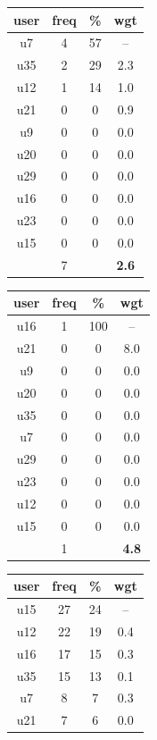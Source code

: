 \begin{table}
\centering
\begin{tabular}{ |c|c|c|c| }
	\hline
	\textbf{user} & \textbf{freq} & \textbf{\%} & \textbf{wgt} \\
	\hline
	u7 & 4 & 57 & -- \\
	u35 & 2 & 29 & 2.3 \\
	u12 & 1 & 14 & 1.0 \\
	u21 & 0 & 0 & 0.9 \\
	u9 & 0 & 0 & 0.0 \\
	u20 & 0 & 0 & 0.0 \\
	u29 & 0 & 0 & 0.0 \\
	u16 & 0 & 0 & 0.0 \\
	u23 & 0 & 0 & 0.0 \\
	u15 & 0 & 0 & 0.0 \\
	 & 7 & & \textbf{2.6} \\
	\hline
\end{tabular}
\begin{tabular}{ |c|c|c|c| }
	\hline
	\textbf{user} & \textbf{freq} & \textbf{\%} & \textbf{wgt} \\
	\hline
	u16 & 1 & 100 & -- \\
	u21 & 0 & 0 & 8.0 \\
	u9 & 0 & 0 & 0.0 \\
	u20 & 0 & 0 & 0.0 \\
	u35 & 0 & 0 & 0.0 \\
	u7 & 0 & 0 & 0.0 \\
	u29 & 0 & 0 & 0.0 \\
	u23 & 0 & 0 & 0.0 \\
	u12 & 0 & 0 & 0.0 \\
	u15 & 0 & 0 & 0.0 \\
	 & 1 & & \textbf{4.8} \\
	\hline
\end{tabular}
\begin{tabular}{ |c|c|c|c| }
	\hline
	\textbf{user} & \textbf{freq} & \textbf{\%} & \textbf{wgt} \\
	\hline
	u15 & 27 & 24 & -- \\
	u12 & 22 & 19 & 0.4 \\
	u16 & 17 & 15 & 0.3 \\
	u35 & 15 & 13 & 0.1 \\
	u7 & 8 & 7 & 0.3 \\
	u21 & 7 & 6 & 0.0 \\

\end{tabular}
\end{table}
